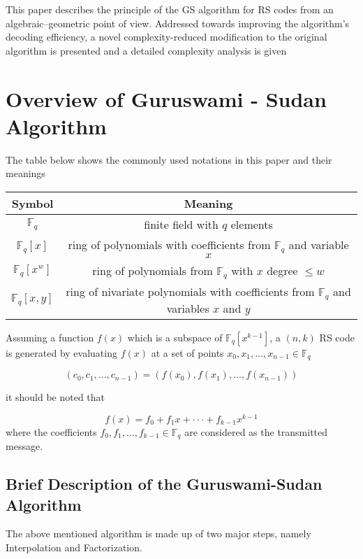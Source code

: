 \documentclass[fontsize=12pt]{article}
\begin{document}
This
paper describes the principle of the GS algorithm for
RS codes from an algebraic–geometric point of view.
Addressed towards improving the algorithm’s decoding
efficiency, a novel complexity-reduced modification to
the original algorithm is presented and a detailed
complexity analysis is given


\section{Overview of Guruswami - Sudan Algorithm}
The table below shows the commonly used notations in this paper and their meanings 

\begin{center}
\begin{tabular}{ | c | c | }

\hline
 Symbol & Meaning \\ 
 \hline \hline
 $\mathbb{F}_q$ & finite field with $q$ elements \\  
 \hline
 $\mathbb{F}_q[x]$ & ring of polynomials with coefficients from $\mathbb{F}_q$ and
variable $x$ \\ 
 \hline
 $\mathbb{F}_q[x^w]$ & ring of polynomials from $\mathbb{F}_q$ with $x$  degree $\leq w$\\  
 \hline
 $\mathbb{F}_q[x,y]$ & ring of nivariate polynomials with coefficients from $\mathbb{F}_q$ and
variables $x $ and $y$\\
 \hline    
\end{tabular}
\end{center}

Assuming a function $f(x)$ which is a subspace of $\mathbb{F}_q[x^{k-1}]$, a $(n,k)$ RS code is generated by evaluating $f(x)$ at a set of points $x_0,x_1,...,x_{n-1} \in \mathbb{F}_q$

$$ (c_0,c_1,...,c_{n-1}) =(f(x_0),f(x_1),...,f(x_{n-1}))$$

it should be noted that 

$$ f(x) = f_0+f_1x+\cdot\cdot\cdot+f_{k-1}x^{k-1}$$
where the coefficients $f_0,f_1,...,f_{k-1} \in \mathbb{F}_q$ are considered as the transmitted message.


\subsection{Brief Description of the Guruswami-Sudan Algorithm}
The above mentioned algorithm is made up of two major steps, namely Interpolation and Factorization.
\end{document}
